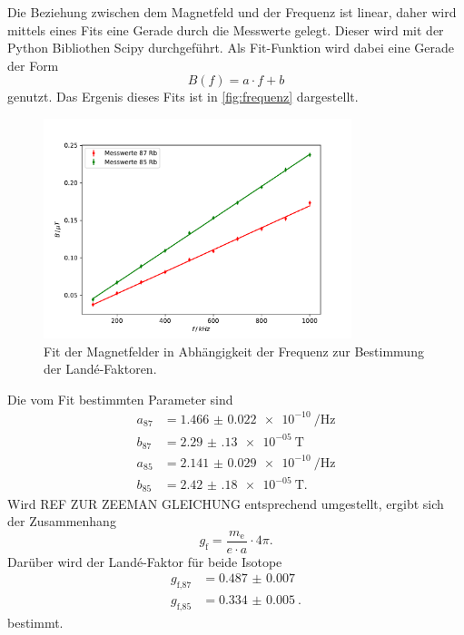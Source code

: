 Die Beziehung zwischen dem Magnetfeld und der Frequenz ist linear, daher wird mittels eines Fits eine Gerade durch die Messwerte gelegt.
Dieser wird mit der Python Bibliothen Scipy durchgeführt.
Als Fit-Funktion wird dabei eine Gerade der Form
\begin{equation}
    B(f) = a \cdot f + b
\end{equation}
genutzt.
Das Ergenis dieses Fits ist in \autoref{fig:frequenz} dargestellt.
\begin{figure}
    \centering
    \includegraphics[width=0.8\textwidth]{plots/frequenz.pdf}
    \caption{Fit der Magnetfelder in Abhängigkeit der Frequenz zur Bestimmung der Landé-Faktoren.}
    \label{fig:frequenz}
\end{figure}
Die vom Fit bestimmten Parameter sind 
\begin{align*}
    a_\text{87} &= \qty{1.466(22)e-10}{\per\hertz} \\
    b_\text{87} &= \qty{2.29(13)e-05}{\tesla} \\
    a_\text{85} &= \qty{2.141(29)e-10}{\per\hertz} \\
    b_\text{85} &= \qty{2.42(18)e-05}{\tesla}.
\end{align*}
Wird REF ZUR ZEEMAN GLEICHUNG entsprechend umgestellt, ergibt sich der Zusammenhang
\begin{equation}
    g_\text{f} = \frac{m_\text{e}}{e \cdot a} \cdot 4\pi.
\end{equation}
Darüber wird der Landé-Faktor für beide Isotope 
\begin{align*}
    g_\text{f,87} &= \qty{0.487(7)}{} \\
    g_\text{f,85} &= \qty{0.334(5)}{}.
\end{align*}
bestimmt.


